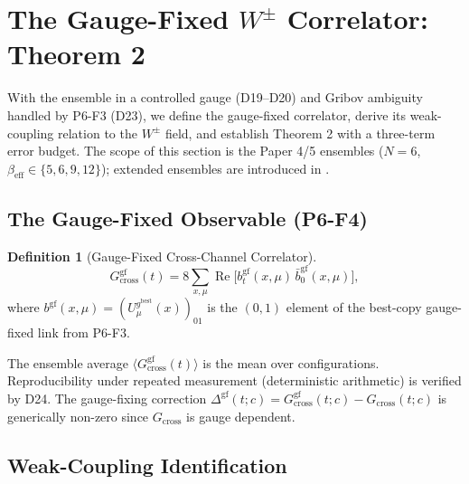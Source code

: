 \documentclass[11pt,a4paper]{article}
\theoremstyle{plain}
\theoremstyle{definition}
\newtheorem{definition}{Definition}
\theoremstyle{remark}
\renewcommand{\Re}{\operatorname{Re}}
\newcommand{\Gcross}{G_{\mathrm{cross}}}
\newcommand{\Gcrossgf}{G_{\mathrm{cross}}^{\mathrm{gf}}}
\newcommand{\be}{\beta_{\mathrm{eff}}}
\begin{document}
\section{The Gauge-Fixed \texorpdfstring{$W^{\pm}$}{W} Correlator:
Theorem 2}
\label{sec:theorem2}

With the ensemble in a controlled gauge (D19--D20) and Gribov ambiguity
handled by P6-F3 (D23), we define the gauge-fixed correlator, derive its
weak-coupling relation to the $W^{\pm}$ field, and establish Theorem 2
with a three-term error budget. The scope of this section is the Paper
4/5 ensembles ($N=6$, $\be\in\{5,6,9,12\}$); extended ensembles are
introduced in .

\subsection{The Gauge-Fixed Observable (P6-F4)}
\label{ssec:gfobs}

\begin{definition}[Gauge-Fixed Cross-Channel Correlator]
\begin{equation}
  \Gcrossgf(t)=8\sum_{x,\mu}\Re\bigl[b^{\mathrm{gf}}_t(x,\mu)\,
  \bar b^{\mathrm{gf}}_0(x,\mu)\bigr],
  \label{eq:gcrossgf}
\end{equation}
where $b^{\mathrm{gf}}(x,\mu)=(U^{g^{\mathrm{best}}}_\mu(x))_{01}$ is the
$(0,1)$ element of the best-copy gauge-fixed link from P6-F3.
\end{definition}

The ensemble average $\langle\Gcrossgf(t)\rangle$ is the mean over
configurations. Reproducibility under repeated measurement (deterministic
arithmetic) is verified by D24. The gauge-fixing correction
$\Delta^{\mathrm{gf}}(t;c)=\Gcrossgf(t;c)-\Gcross(t;c)$ is generically
non-zero since $\Gcross$ is gauge dependent.

\subsection{Weak-Coupling Identification}
\label{ssec:weakcoupling}
\end{document}
